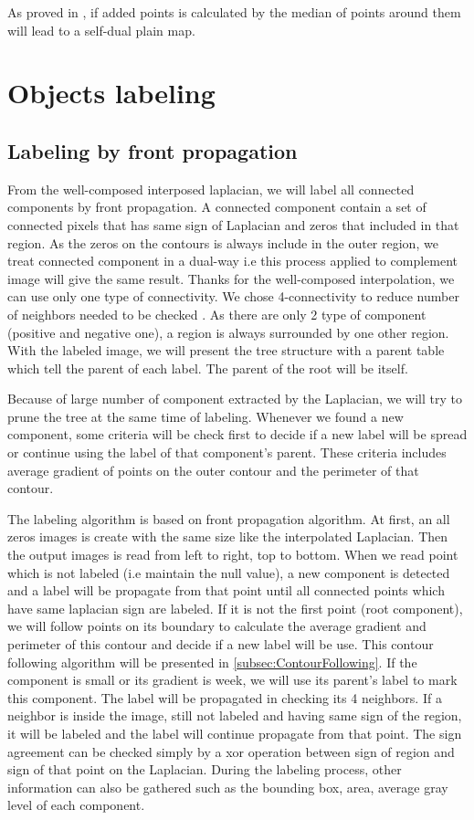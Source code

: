 \par
As proved in \cite{geraud.15.ismm}, if added points is calculated by the median of points around them will lead to a self-dual plain map.


\section{Objects labeling}

\subsection{Labeling by front propagation} \label{labeling}
\par From the well-composed interposed laplacian, we will label all connected components by front propagation. A connected component contain a set of connected pixels that has same sign of Laplacian and zeros that included in that region. As the zeros on the contours is always include in the outer region, we treat connected component in a dual-way i.e this process applied to complement image will give the same result. Thanks for the well-composed interpolation, we can use only one type of connectivity. We chose 4-connectivity to reduce number of neighbors needed to be checked . As there are only 2 type of component (positive and negative one), a region is always surrounded by one other region. With the labeled image, we will present the tree structure with a parent table which tell the parent of each label. The parent of the root will be itself.
\par
Because of large number of component extracted by the Laplacian, we will try to prune the tree at the same time of labeling. Whenever we found a new component, some criteria will be check first to decide if a new label will be spread or continue using the label of that component's parent. These criteria includes average gradient of points on the outer contour and the perimeter of that contour.  
\par
The labeling algorithm is based on front propagation algorithm. At first, an all zeros images is create with the same size like the interpolated Laplacian. Then the output images is read from left to right, top to bottom. When we read point which is not labeled (i.e maintain the null value), a new component is detected and a label will be propagate from that point until all connected points which have same laplacian sign are labeled. If it is not the first point (root component), we will follow points on its boundary to calculate the average gradient and perimeter of this contour and decide if a new label will be use. This contour following algorithm will be presented in \ref{subsec:ContourFollowing}. If the component is small or its gradient is week, we will use its parent's label to mark this component. The label will be propagated in checking its 4 neighbors. If a neighbor is inside the image, still not labeled and having same sign of the region, it will be labeled and the label will continue propagate from that point. The sign agreement can be checked simply by a xor operation between sign of region and sign of that point on the Laplacian. During the labeling process, other information can also be gathered such as the bounding box, area, average gray level of each component. 
